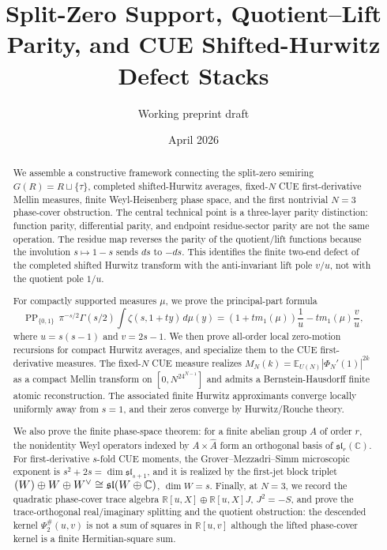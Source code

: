\documentclass[11pt]{article}
\title{Split-Zero Support, Quotient--Lift Parity, and CUE Shifted-Hurwitz Defect Stacks}
\author{Working preprint draft}
\date{April 2026}
\let\End\relax
\DeclareMathOperator{\End}{End}
\newcommand{\C}{\mathbb C}
\newcommand{\R}{\mathbb R}
\newcommand{\PP}{\operatorname{PP}}
\begin{document}
\maketitle

\begin{abstract}
We assemble a constructive framework connecting the split-zero semiring
$G(R)=R\sqcup\{\tau\}$, completed shifted-Hurwitz averages, fixed-$N$ CUE
first-derivative Mellin measures, finite Weyl-Heisenberg phase space, and the
first nontrivial $N=3$ phase-cover obstruction.  The central technical point is a
three-layer parity distinction: function parity, differential parity, and endpoint
residue-sector parity are not the same operation.  The residue map reverses the
parity of the quotient/lift functions because the involution $s\mapsto 1-s$ sends
$ds$ to $-ds$.  This identifies the finite two-end defect of the completed shifted
Hurwitz transform with the anti-invariant lift pole $v/u$, not with the quotient
pole $1/u$.

For compactly supported measures $\mu$, we prove the principal-part formula
\[
\PP_{\{0,1\}}\,\pi^{-s/2}\Gamma(s/2)\int\zeta(s,1+ty)\,d\mu(y)
=(1+t m_1(\mu))\frac1u-tm_1(\mu)\frac vu,
\]
where $u=s(s-1)$ and $v=2s-1$.  We then prove all-order local zero-motion
recursions for compact Hurwitz averages, and specialize them to the CUE
first-derivative measures.  The fixed-$N$ CUE measure realizes
$M_N(k)=\mathbb E_{U(N)}|\Phi_N'(1)|^{2k}$ as a compact Mellin transform on
$[0,N^24^{N-1}]$ and admits a Bernstein-Hausdorff finite atomic reconstruction.
The associated finite Hurwitz approximants converge locally uniformly away from
$s=1$, and their zeros converge by Hurwitz/Rouche theory.

We also prove the finite phase-space theorem: for a finite abelian group $A$ of
order $r$, the nonidentity Weyl operators indexed by $A\times\widehat A$ form an
orthogonal basis of $\mathfrak{sl}_r(\C)$.  For first-derivative $s$-fold CUE
moments, the Grover--Mezzadri--Simm microscopic exponent is
$s^2+2s=\dim\mathfrak{sl}_{s+1}$, and it is realized by the first-jet block
triplet $\End(W)\oplus W\oplus W^\vee\cong\mathfrak{sl}(W\oplus\C)$,
$\dim W=s$.  Finally, at $N=3$, we record the quadratic phase-cover trace algebra
$\R[u,X]\oplus\R[u,X]J$, $J^2=-S$, and prove the trace-orthogonal real/imaginary
splitting and the quotient obstruction: the descended kernel $\Psi_2^\#(u,v)$ is
not a sum of squares in $\R[u,v]$ although the lifted phase-cover kernel is a
finite Hermitian-square sum.
\end{abstract}
\end{document}
